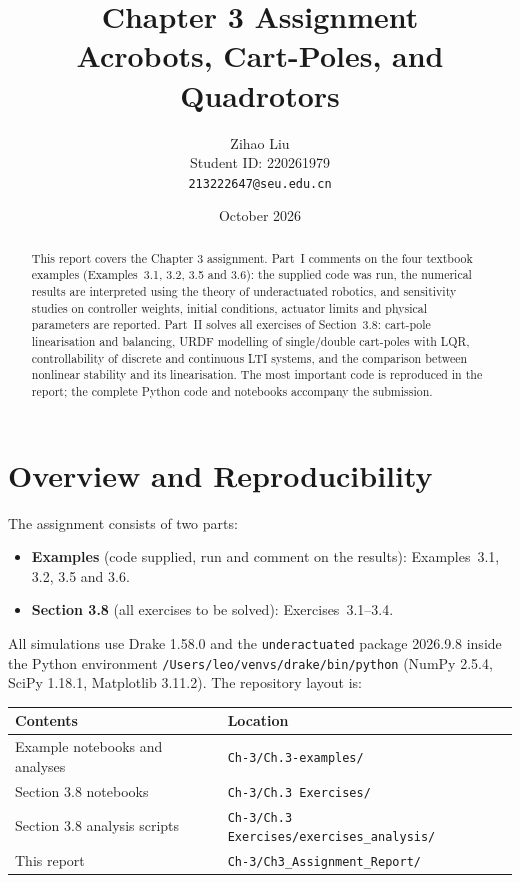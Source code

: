 \documentclass[11pt]{article}
\title{\textbf{Chapter 3 Assignment}\\[4pt]
Acrobots, Cart-Poles, and Quadrotors}
\author{Zihao Liu\\[2pt]
Student ID: 220261979\\[2pt]
\texttt{213222647@seu.edu.cn}}
\date{October 2026}
\begin{document}
\maketitle

\begin{abstract}
This report covers the Chapter 3 assignment.  Part~I comments on the four
textbook examples (Examples~3.1, 3.2, 3.5 and 3.6): the supplied code was run,
the numerical results are interpreted using the theory of underactuated
robotics, and sensitivity studies on controller weights, initial conditions,
actuator limits and physical parameters are reported.  Part~II solves all
exercises of Section~3.8: cart-pole linearisation and balancing, URDF modelling
of single/double cart-poles with LQR, controllability of discrete and continuous
LTI systems, and the comparison between nonlinear stability and its
linearisation.  The most important code is reproduced in the report; the complete
Python code and notebooks accompany the submission.
\end{abstract}

\tableofcontents
\newpage

\section{Overview and Reproducibility}

The assignment consists of two parts:
\begin{itemize}[leftmargin=1.5em]
  \item \textbf{Examples} (code supplied, run and comment on the results):
        Examples~3.1, 3.2, 3.5 and 3.6.
  \item \textbf{Section 3.8} (all exercises to be solved): Exercises~3.1--3.4.
\end{itemize}

All simulations use Drake 1.58.0 and the \texttt{underactuated} package
2026.9.8 inside the Python environment
\texttt{/Users/leo/venvs/drake/bin/python} (NumPy 2.5.4, SciPy 1.18.1,
Matplotlib 3.11.2).  The repository layout is:
\begin{center}
\begin{tabular}{ll}
\toprule
Contents & Location \\
\midrule
Example notebooks and analyses & \texttt{Ch-3/Ch.3-examples/} \\
Section 3.8 notebooks & \texttt{Ch-3/Ch.3 Exercises/} \\
Section 3.8 analysis scripts & \texttt{Ch-3/Ch.3 Exercises/exercises\_analysis/} \\
This report & \texttt{Ch-3/Ch3\_Assignment\_Report/} \\
\bottomrule
\end{tabular}
\end{center}
\end{document}
